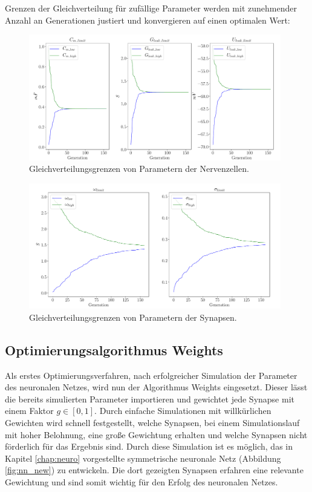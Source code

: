 		Grenzen der Gleichverteilung für zufällige Parameter werden mit zunehmender Anzahl an Generationen justiert und konvergieren auf einen optimalen Wert:
		\begin{figure}[H]
			\centering
			\includegraphics[width=11cm]{figures/chap_implement/ga_neuron.pdf}
			\caption{Gleichverteilungsgrenzen von Parametern der Nervenzellen.}
			\label{fig:ga_1}
		\end{figure}
		\begin{figure}[H]
			\centering
			\includegraphics[width=11cm]{figures/chap_implement/ga_synapse.pdf}
			\caption{Gleichverteilungsgrenzen von Parametern der Synapsen.}
			\label{fig:ga_2}
		\end{figure}
	
	\subsection{Optimierungsalgorithmus Weights}
		Als erstes Optimierungsverfahren, nach erfolgreicher Simulation der Parameter des neuronalen Netzes, wird nun der Algorithmus Weights eingesetzt. Dieser lässt die bereits simulierten Parameter importieren und gewichtet jede Synapse mit einem Faktor $g\in[0,1]$. Durch einfache Simulationen mit willkürlichen Gewichten wird schnell festgestellt, welche Synapsen, bei einem Simulationslauf mit hoher Belohnung, eine große Gewichtung erhalten und welche Synapsen nicht förderlich für das Ergebnis sind. Durch diese Simulation ist es möglich, das in Kapitel \ref{chap:neuro} vorgestellte symmetrische neuronale Netz (Abbildung \ref{fig:nn_new}) zu entwickeln. Die dort gezeigten Synapsen erfahren eine relevante Gewichtung und sind somit wichtig für den Erfolg des neuronalen Netzes.
		
